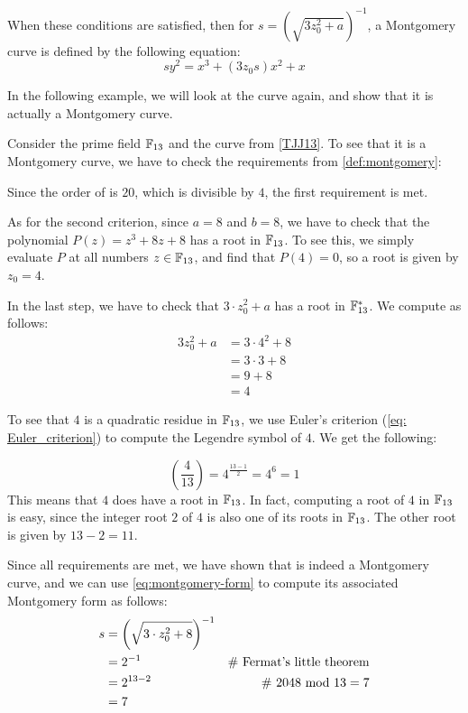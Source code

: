 When these conditions are satisfied, then for $s=({\sqrt{3z_0^{2}+a}})^{-1}$, a Montgomery curve is defined by the following equation:
\begin{equation}\label{eq:montgomery-form}
sy^{2}=x^{3}+(3z_0 s)x^{2}+x
\end{equation}

In the following example, we will look at the  curve again, and show that it is actually a Montgomery curve.
\begin{example}\label{TJJ13-montgomery}
Consider the prime field $\mathbb{F}_{13}$ and the  curve \TJJ{} from \examplename{} \ref{TJJ13}. To see that it is a Montgomery curve, we have to check the requirements from  \ref{def:montgomery}: 

Since the order  of \TJJ{} is $20$, which is divisible by $4$, the first requirement is met.

As for the second criterion, since $a=8$ and $b=8$, we have to check that the polynomial $P(z) = z^3 + 8z + 8$ has a root in $\mathbb{F}_{13}$. To see this, we simply evaluate $P$ at all numbers $z\in \mathbb{F}_{13}$, and find that $P(4)=0$, so a root is given by $z_0=4$. 

In the last step, we have to check that $3\cdot z_0^2 + a$ has a root in $\mathbb{F}_{13}^*$. We compute as follows:
\begin{align*}
3z_0^2 + a & = 3\cdot 4^2 + 8 \\
           & = 3 \cdot 3 + 8 \\
           & = 9 + 8 \\
           & = 4
\end{align*}

To see that $4$ is a quadratic residue in $\mathbb{F}_{13}$, we use Euler's criterion (\ref{eq: Euler_criterion}) to compute the Legendre symbol of $4$. We get the following:

$$
\left(\frac{4}{13}\right) = 4^{\frac{13-1}{2}} = 4^6 = 1
$$ 
This means that $4$ does have a root in $\mathbb{F}_{13}$. In fact, computing a root of $4$ in $\mathbb{F}_{13}$ is easy, since the integer root $2$ of $4$ is also one of its roots in $\mathbb{F}_{13}$. The other root is given by $13-2=11$.

Since all requirements are met, we have shown that \TJJ{} is indeed a Montgomery curve, and we can use \eqref{eq:montgomery-form} to compute its associated Montgomery form as follows:
\begin{align*}
s & = \left(\sqrt{3\cdot z_0^2 +8}\right)^{-1} \\
  & = 2^{-1} & \text{\# Fermat's little theorem} \\
  & = 2^{13-2} & \text{\# }2048 \text{ mod } 13 = 7\\
  & = 7
\end{align*}


\end{example}
